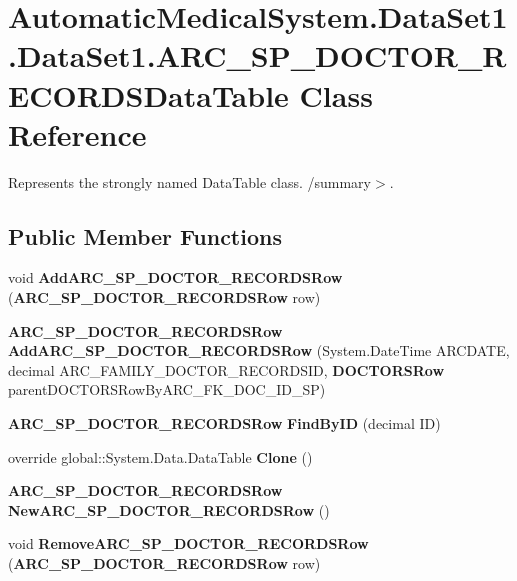 \section{AutomaticMedicalSystem.DataSet1.DataSet1.ARC\_\-SP\_\-DOCTOR\_\-RECORDSDataTable Class Reference}
\label{class_automatic_medical_system_1_1_data_set1_1_1_a_r_c___s_p___d_o_c_t_o_r___r_e_c_o_r_d_s_data_table}
Represents the strongly named DataTable class. /summary$>$.  


\subsection*{Public Member Functions}
\begin{CompactItemize}
\item 
void \textbf{AddARC\_\-SP\_\-DOCTOR\_\-RECORDSRow} ({\bf ARC\_\-SP\_\-DOCTOR\_\-RECORDSRow} row)\label{class_automatic_medical_system_1_1_data_set1_1_1_a_r_c___s_p___d_o_c_t_o_r___r_e_c_o_r_d_s_data_table_6af0be875cda1ba1d655de965a6bc430}

\item 
{\bf ARC\_\-SP\_\-DOCTOR\_\-RECORDSRow} \textbf{AddARC\_\-SP\_\-DOCTOR\_\-RECORDSRow} (System.DateTime ARCDATE, decimal ARC\_\-FAMILY\_\-DOCTOR\_\-RECORDSID, {\bf DOCTORSRow} parentDOCTORSRowByARC\_\-FK\_\-DOC\_\-ID\_\-SP)\label{class_automatic_medical_system_1_1_data_set1_1_1_a_r_c___s_p___d_o_c_t_o_r___r_e_c_o_r_d_s_data_table_597df3e02e6765cedbe8fe084e36660a}

\item 
{\bf ARC\_\-SP\_\-DOCTOR\_\-RECORDSRow} \textbf{FindByID} (decimal ID)\label{class_automatic_medical_system_1_1_data_set1_1_1_a_r_c___s_p___d_o_c_t_o_r___r_e_c_o_r_d_s_data_table_820e30bcce5697b3f83643d01508042d}

\item 
override global::System.Data.DataTable \textbf{Clone} ()\label{class_automatic_medical_system_1_1_data_set1_1_1_a_r_c___s_p___d_o_c_t_o_r___r_e_c_o_r_d_s_data_table_2768795a1aa19565cf9a299452d9d1fe}

\item 
{\bf ARC\_\-SP\_\-DOCTOR\_\-RECORDSRow} \textbf{NewARC\_\-SP\_\-DOCTOR\_\-RECORDSRow} ()\label{class_automatic_medical_system_1_1_data_set1_1_1_a_r_c___s_p___d_o_c_t_o_r___r_e_c_o_r_d_s_data_table_7749a78c6402cd3af092ccf55c157ae6}

\item 
void \textbf{RemoveARC\_\-SP\_\-DOCTOR\_\-RECORDSRow} ({\bf ARC\_\-SP\_\-DOCTOR\_\-RECORDSRow} row)\label{class_automatic_medical_system_1_1_data_set1_1_1_a_r_c___s_p___d_o_c_t_o_r___r_e_c_o_r_d_s_data_table_acced897f2707d5e504bcf2215b4462d}

\end{CompactItemize}
